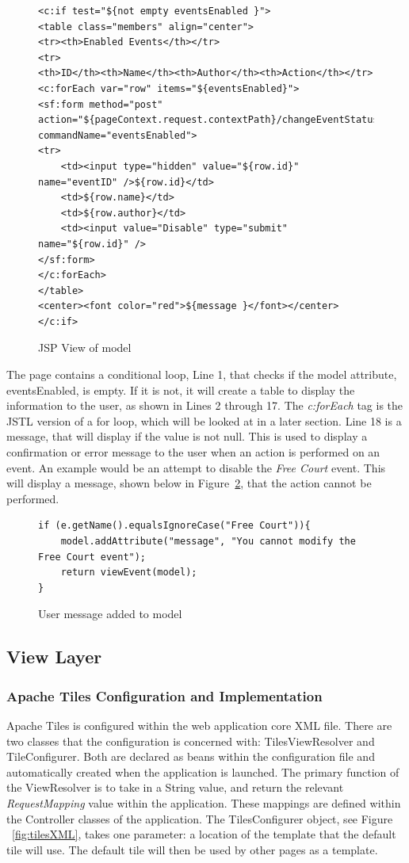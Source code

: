 \begin{figure}[H]
\begin{lstlisting}
<c:if test="${not empty eventsEnabled }">
<table class="members" align="center">
<tr><th>Enabled Events</th></tr>
<tr>
<th>ID</th><th>Name</th><th>Author</th><th>Action</th></tr>
<c:forEach var="row" items="${eventsEnabled}">
<sf:form method="post"
action="${pageContext.request.contextPath}/changeEventStatus"
commandName="eventsEnabled">
<tr>
	<td><input type="hidden" value="${row.id}" name="eventID" />${row.id}</td>
	<td>${row.name}</td>
	<td>${row.author}</td>
	<td><input value="Disable" type="submit" name="${row.id}" />
</sf:form>
</c:forEach>
</table>
<center><font color="red">${message }</font></center>
</c:if>
\end{lstlisting}
\caption{JSP View of model}
\label{fig:modelJSP}
\end{figure}

The page contains a conditional loop, Line 1, that checks if the model attribute, eventsEnabled, is empty. If it is not, it will create a table to display the information to the user, as shown in Lines 2 through 17. The \textit{c:forEach} tag is the JSTL version of a for loop, which will be looked at in a later section. Line 18 is a message, that will display if the value is not null. This is used to display a confirmation or error message to the user when an action is performed on an event. An example would be an attempt to disable the \textit{Free Court} event. This will display a message, shown below in Figure~\ref{fig:modelFail}, that the action cannot be performed.

\begin{figure}[H]
\begin{lstlisting}
if (e.getName().equalsIgnoreCase("Free Court")){
	model.addAttribute("message", "You cannot modify the Free Court event");
	return viewEvent(model);
}
\end{lstlisting}
\caption{User message added to model}
\label{fig:modelFail}
\end{figure}

\subsection{View Layer}
\subsubsection{Apache Tiles Configuration and Implementation}
Apache Tiles is configured within the web application core XML file. There are two classes that the configuration is concerned with: TilesViewResolver and TileConfigurer. Both are declared as beans within the configuration file and automatically created when the application is launched. The primary function of the ViewResolver is to take in a String value, and return the relevant \textit{RequestMapping} value within the application. These mappings are defined within the Controller classes of the application. The TilesConfigurer object, see Figure ~\ref{fig:tilesXML}, takes one parameter: a location of the template that the default tile will use. The default tile will then be used by other pages as a template. \newline

